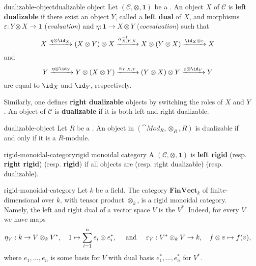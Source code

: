 \begin{topic}{dualizable-object}{dualizable object}
    Let $(\mathcal{C}, \otimes, \textbf{1})$ be a . An object $X$ of $\mathcal{C}$ is \textbf{left dualizable} if there exist an object $Y$, called a \textbf{left dual} of $X$, and morphisms $\varepsilon : Y \otimes X \to \textbf{1}$ (\textit{evaluation}) and $\eta : \textbf{1} \to X \otimes Y$ (\textit{coevaluation}) such that
    \[ X \xrightarrow{\eta \otimes \id_X} (X \otimes Y) \otimes X \xrightarrow{\alpha_{X, Y, X}^{-1}} X \otimes (Y \otimes X) \xrightarrow{\id_X \otimes \varepsilon} X \]
    and
    \[ Y \xrightarrow{\eta \otimes \id_Y} Y \otimes (X \otimes Y) \xrightarrow{\alpha_{Y, X, Y}} (Y \otimes X) \otimes Y \xrightarrow{\varepsilon \otimes \id_Y} Y \]
    are equal to $\id_X$ and $\id_Y$, respectively.
    
    Similarly, one defines \textbf{right dualizable} objects by switching the roles of $X$ and $Y$.
    An object of $\mathcal{C}$ is \textbf{dualizable} if it is both left and right dualizable.
\end{topic}

\begin{example}{dualizable-object}
    Let $R$ be a . An object in $(\cat{Mod}_R, \otimes_R, R)$ is dualizable if and only if it is a   $R$-module.
\end{example}

\begin{topic}{rigid-monoidal-category}{rigid monoidal category}
    A  $(\mathcal{C}, \otimes, \textbf{1})$ is \textbf{left rigid} (resp. \textbf{right rigid}) (resp. \textbf{rigid}) if all objects are  (resp. right dualizable) (resp. dualizable).
\end{topic}

\begin{example}{rigid-monoidal-category}
    Let $k$ be a field. The category $\textbf{FinVect}_k$ of finite-dimensional  over $k$, with tensor product $\otimes_k$, is a rigid monoidal category. Namely, the left and right dual of a vector space $V$ is the  $V^*$. Indeed, for every $V$ we have maps
    \[ \eta_V : k \to V \otimes_k V^*, \quad 1 \mapsto \sum_{i = 1}^{n} e_i \otimes e^*_i , \quad \textup{ and } \quad \varepsilon_V : V^* \otimes_k V \to k, \quad f \otimes v \mapsto f(v) , \]
    where $e_1, \ldots, e_n$ is some basis for $V$ with dual basis $e^*_1, \ldots, e^*_n$ for $V^*$.
\end{example}

